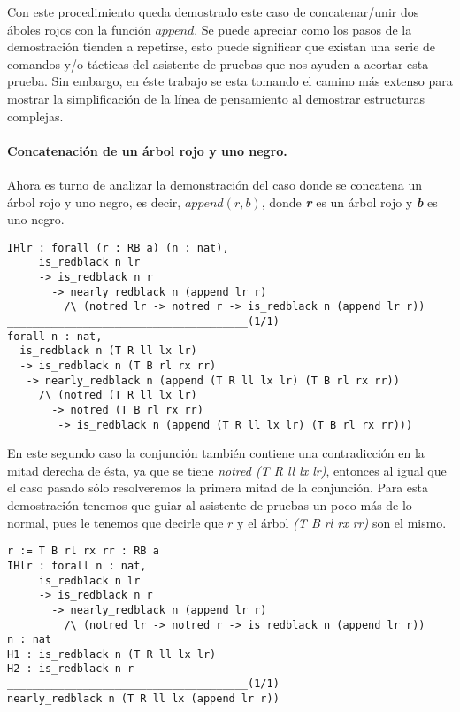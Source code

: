Con este procedimiento queda demostrado este caso de concatenar/unir dos \'aboles rojos con la 
funci\'on \hyperref[func_app]{$append$}. Se puede apreciar como los pasos de la demostraci\'on 
tienden a repetirse, esto puede significar que existan una serie de comandos y/o t\'acticas del 
asistente de pruebas que nos ayuden a acortar esta prueba. Sin embargo, en \'este trabajo se esta 
tomando el camino m\'as extenso para mostrar la simplificaci\'on de la l\'inea de pensamiento al 
demostrar estructuras complejas.

\paragraph{Concatenaci\'on de un \'arbol rojo y uno negro.}

Ahora es turno de analizar la demonstraci\'on del caso donde se concatena un \'arbol rojo y uno 
negro, es decir, $append(r,b)$, donde \textbf{\textit{r}} es un \'arbol rojo y \textbf{\textit{b}} es uno negro.

\begin{verbatim}
IHlr : forall (r : RB a) (n : nat),
     is_redblack n lr
     -> is_redblack n r
       -> nearly_redblack n (append lr r)
         /\ (notred lr -> notred r -> is_redblack n (append lr r))
______________________________________(1/1)
forall n : nat,
  is_redblack n (T R ll lx lr)
  -> is_redblack n (T B rl rx rr)
   -> nearly_redblack n (append (T R ll lx lr) (T B rl rx rr))
     /\ (notred (T R ll lx lr)
       -> notred (T B rl rx rr)
        -> is_redblack n (append (T R ll lx lr) (T B rl rx rr)))
\end{verbatim}

En este segundo caso la conjunci\'on tambi\'en contiene una contradicci\'on en la mitad derecha de
\'esta, ya que se tiene \textit{notred (T R ll lx lr)}, entonces al igual que el caso pasado s\'olo
resolveremos la primera mitad de la conjunci\'on. Para esta demostración tenemos que guiar al 
asistente de pruebas un poco m\'as de lo normal, pues le tenemos que decirle que $r$ y el árbol 
\textit{(T B rl rx rr)} son el mismo.

\begin{verbatim}
r := T B rl rx rr : RB a
IHlr : forall n : nat,
     is_redblack n lr
     -> is_redblack n r
       -> nearly_redblack n (append lr r)
         /\ (notred lr -> notred r -> is_redblack n (append lr r))
n : nat
H1 : is_redblack n (T R ll lx lr)
H2 : is_redblack n r
______________________________________(1/1)
nearly_redblack n (T R ll lx (append lr r))
\end{verbatim}

